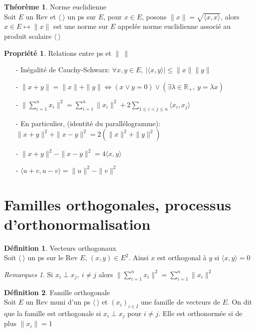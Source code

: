 \documentclass[fleqn]{article}
\theoremstyle{definition} \newtheorem*{defi}{D\'efinition}
\theoremstyle{definition} \newtheorem*{theo}{Th\'eor\`eme}
\theoremstyle{definition} \newtheorem*{coro}{Corollaire}
\theoremstyle{remark} \newtheorem*{rqs}{Remarques}
\theoremstyle{definition} \newtheorem*{prop}{Propri\'et\'e}
\begin{document}
\begin{theo}  Norme euclidienne \\
	Soit $E$ un Rev et $\langle\ \rangle$ un ps sur $E$, pour $x \in E$, posons \mbox{$\|x\| = \sqrt{\langle x,x \rangle}$}, alors $x \in E
	\mapsto \|x\|$ est une norme sur $E$ appel\'ee norme euclidienne associ\'e au produit scalaire $\langle\ \rangle$
\end{theo}

\begin{prop} Relations entre ps et $\| \ \|$
	\begin{enumerate}
		\item [-] In\'egalit\'e de Cauchy-Schwarz: $\forall x,y \in E,\ |\langle x,y \rangle| \leq \|x\| \|y\|$
		\item [-] $\|x+y\| = \|x\| + \|y\| \Leftrightarrow (x \lor y = 0) \lor (\exists \lambda \in \mathbb{R}_+,\ y = \lambda x)$
		\item [-] $\|\sum_{i=1}^n x_i \| ^2 = \sum_{i=1}^n \|x_i\|^2 + 2\sum_{1 \leq i < j \leq n} \langle x_i,x_j \rangle$
		\item [-] En particulier, (identit\'e du parall\'elogramme):\\
			$\|x+y\|^2 + \|x-y\|^2 = 2(\|x\|^2 + \|y\|^2)$
		\item [-] $\|x+y\|^2 - \|x-y\|^2= 4\langle x,y \rangle$
		\item [-] $\langle u+v, u-v \rangle = \|u\|^2 - \|v\|^2$
	\end{enumerate}
\end{prop}

\section{Familles orthogonales, processus d'orthonormalisation}

\begin{defi} Vecteurs orthogonaux \\
	Soit $\langle\ \rangle$ un ps sur le Rev $E$, $(x,y) \in E^2$. Ainsi $x$ est orthogonal \`a $y$ si $\langle x,y \rangle = 0$
	\begin{rqs} Si $x_i \perp x_j,\ i \neq j$ alors $\|\sum_{i=1}^n x_i \|^2 = \sum_{i=1}^n \|x_i\|^2$ \end{rqs}
\end{defi}

\begin{defi} Famille orthogonale \\
	Soit $E$ un Rev muni d'un ps $\langle\ \rangle$ et $(x_i)_{i\in I}$ une famille de vecteurs de $E$. On dit que la famille est orthogonale si
	$x_i \perp x_j$ pour $i\neq j$. Elle est orthonorm\'ee si de plus $\|x_i\| = 1$
\end{defi}
\end{document}
